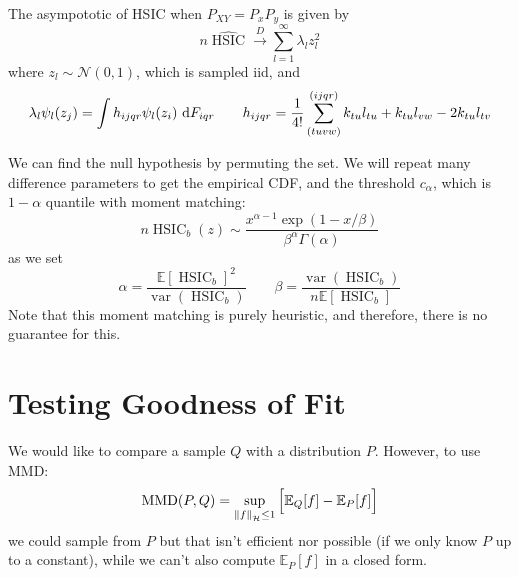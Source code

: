 \begin{theorem}
    The asympototic of HSIC when $P_{XY} = P_xP_y$ is given by
    \begin{equation*}
        n\widehat{\operatorname{HSIC}}\xrightarrow{D}\sum^\infty_{l=1}\lambda_lz^2_l
    \end{equation*}
    where $z_l\sim\mathcal{N}(0, 1)$, which is sampled iid, and
    \begin{equation*}
        \lambda_l\psi_l(z_j) = \int h_{ijqr}\psi_l(z_i)\ \mathrm{d} F_{iqr} \qquad h_{ijqr}=\frac{1}{4!}\sum^{(ijqr)}_{(tuvw)} k_{tu}l_{tu} + k_{tu}l_{vw}-2k_{tu}l_{tv}
    \end{equation*}
\end{theorem}

\begin{remark}
    We can find the null hypothesis by permuting the set. We will repeat many difference parameters to get the empirical CDF, and the threshold $c_\alpha$, which is $1-\alpha$ quantile with moment matching:
    \begin{equation*}
        n\operatorname{HSIC}_b(z) \sim \frac{x^{\alpha-1}\exp(1-x/\beta)}{\beta^\alpha\Gamma(\alpha)}
    \end{equation*}
    as we set 
    \begin{equation*}
        \alpha = \frac{\mathbb{E}[\operatorname{HSIC}_b]^2}{\operatorname{var}(\operatorname{HSIC}_b)} \qquad \beta = \frac{\operatorname{var}(\operatorname{HSIC}_b)}{n\mathbb{E}[\operatorname{HSIC}_b]}
    \end{equation*}
    Note that this moment matching is purely heuristic, and therefore, there is no guarantee for this.
\end{remark}

\section{Testing Goodness of Fit}

\begin{remark}
    We would like to compare a sample $Q$ with a distribution $P$. However, to use MMD:
    \begin{equation*}
        \operatorname{MMD}(P, Q) = \sup_{\left\lVert f\right\rVert_\mathcal{H}\le1}\Big[ \mathbb{E}_Q[f] - \mathbb{E}_P[f] \Big]
    \end{equation*}
    we could sample from $P$ but that isn't efficient nor possible (if we only know $P$ up to a constant), while we can't also compute $\mathbb{E}_P[f]$ in a closed form.
\end{remark}

